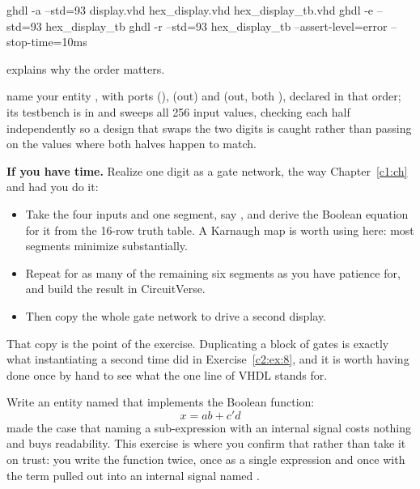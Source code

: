 \begin{shell}
ghdl -a --std=93 display.vhd hex_display.vhd hex_display_tb.vhd
ghdl -e --std=93 hex_display_tb
ghdl -r --std=93 hex_display_tb --assert-level=error --stop-time=10ms
\end{shell}

\noindent{} explains why the order matters.


\selfcheck name your entity , with ports 
(),  (out) and  (out, both
), declared in that order; its testbench is in
 and sweeps all 256 input values, checking each half independently so a
design that swaps the two digits is caught rather than passing on the values where both halves
happen to match.

\label{c2:ex:9}
\textbf{If you have time.} Realize one digit as a gate network, the way Chapter~\ref{c1:ch} and
 had you do it:
\begin{itemize}
  \item Take the four inputs and one segment, say , and derive the Boolean equation for it
    from the 16-row truth table. A Karnaugh map is worth using here: most segments minimize
    substantially.
  \item Repeat for as many of the remaining six segments as you have patience for, and build the
    result in CircuitVerse.
  \item Then copy the whole gate network to drive a second display.
\end{itemize}
That copy is the point of the exercise. Duplicating a block of gates is exactly what instantiating
 a second time did in Exercise~\ref{c2:ex:8}, and it is worth having done once by hand
to see what the one line of VHDL stands for.

\label{c2:set:5}

\label{c2:ex:10}
Write an entity named  that implements the Boolean function:
\[ x = ab + c'd \]
 made the case that naming a sub-expression with an internal signal costs nothing and
buys readability. This exercise is where you confirm that rather than take it on trust: you write
the function twice, once as a single expression and once with the  term pulled out into
an internal signal named .

